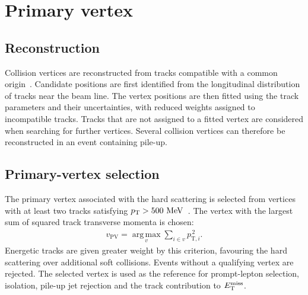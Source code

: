 \section{Primary vertex}
\label{sec:ch6_primary_vertex}

\subsection{Reconstruction}

Collision vertices are reconstructed from tracks compatible with a common origin~\cite{ATLAS2015Vertex}.
Candidate positions are first identified from the longitudinal distribution of tracks near the beam line.
The vertex positions are then fitted using the track parameters and their uncertainties, with reduced weights assigned to incompatible tracks.
Tracks that are not assigned to a fitted vertex are considered when searching for further vertices.
Several collision vertices can therefore be reconstructed in an event containing pile-up.

\subsection{Primary-vertex selection}

The primary vertex associated with the hard scattering is selected from vertices with at least two tracks satisfying $p_{\mathrm{T}}>500~\mathrm{MeV}$~\cite{ATLAS2026LQTauNu}.
The vertex with the largest sum of squared track transverse momenta is chosen:
\begin{align}
    v_{\mathrm{PV}}=\operatorname*{arg\,max}_{v}
    \sum_{i\in v}p_{\mathrm{T},i}^{\,2}.
    \label{eq:ch6_primary_vertex}
\end{align}
Energetic tracks are given greater weight by this criterion, favouring the hard scattering over additional soft collisions.
Events without a qualifying vertex are rejected.
The selected vertex is used as the reference for prompt-lepton selection, isolation, pile-up jet rejection and the track contribution to $E_{\mathrm{T}}^{\mathrm{miss}}$.
